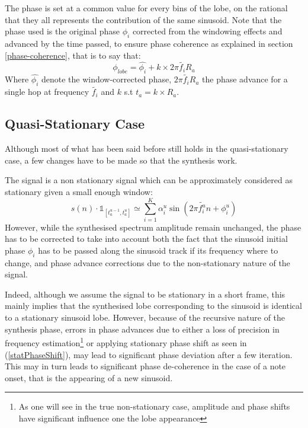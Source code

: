 \documentclass[]{article}
\begin{document}
The phase is set at a common value for every bins of the lobe, on the rational that they all represents the contribution of the same sinusoid. Note that the phase used is the original phase $\phi_{i}$ corrected from the windowing effects and advanced by the time passed, to ensure phase coherence as explained in section \ref{phase-coherence}, that is to say that:
\begin{equation}\label{statPhaseShift}
\phi_{lobe} = \hat{\phi_{i}} + k\times 2\pi \tilde{f_i} R_a
\end{equation}
Where $\hat{\phi_{i}}$ denote the window-corrected phase, $2\pi \tilde{f_i} R_a$ the phase advance for a single hop at frequency $\tilde{f_i}$ and $k$ s.t $t_a = k\times R_a$.
\subsection{Quasi-Stationary Case}\label{quasi-stationary-case}
Although most of what has been said before still holds in the quasi-stationary case, a few changes have to be made so that the synthesis work.

The signal is a non stationary signal which can be approximately considered as stationary given a small enough window:
\begin{equation}
s(n)\cdot \mathds{1}_{[t_a^{u-1}, t_a^u]} \simeq \sum_{i=1}^{K}\alpha_i^{u} \sin(2\pi \tilde{f_i^{u}} n + \phi_{i}^u)
\end{equation}
However, while the synthesised spectrum amplitude remain unchanged, the phase has to be corrected to take into account both the fact that the sinusoid initial phase $\phi_i$ has to be passed along the sinusoid track if its frequency where to change, and phase advance corrections due to the non-stationary nature of the signal. 

Indeed, although we assume the signal to be stationary in a short frame, this mainly implies that the synthesised lobe corresponding to the sinusoid is identical to a stationary sinusoid lobe. However, because of the recursive nature of the synthesis phase, errors in phase advances due to either a loss of precision in frequency estimation\footnote{As one will see in the true non-stationary case, amplitude and phase shifts have significant influence one the lobe appearance} or applying stationary phase shift as seen in (\ref{statPhaseShift}), may lead to significant phase deviation after a few iteration. This may in turn leads to significant phase de-coherence in the case of a note onset, that is the appearing of a new sinusoid.
\end{document}
